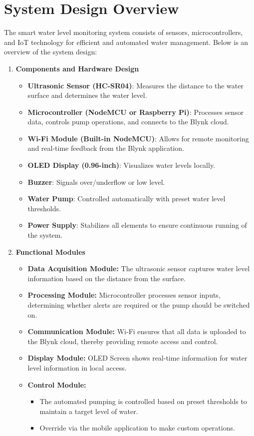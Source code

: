 \section{System Design Overview}
{\fontsize{12}{14}\selectfont
    The smart water level monitoring system consists of sensors, microcontrollers, and IoT technology for efficient and automated water management. Below is an overview of the system design: \\
    
    \begin{enumerate}
    \item \textbf{Components and Hardware Design}
    \begin{itemize}
        \item \textbf{Ultrasonic Sensor (HC-SR04)}: Measures the distance to the water surface and determines the water level.
        \item \textbf{Microcontroller (NodeMCU or Raspberry Pi)}: Processes sensor data, controls pump operations, and connects to the Blynk cloud.
        \item \textbf{Wi-Fi Module (Built-in NodeMCU)}: Allows for remote monitoring and real-time feedback from the Blynk application.
        \item \textbf{OLED Display (0.96-inch)}: Visualizes water levels locally.
        \item \textbf{Buzzer}: Signals over/underflow or low level.
        \item \textbf{Water Pump}: Controlled automatically with preset water level thresholds.
        \item \textbf{Power Supply}: Stabilizes all elements to ensure continuous running of the system.
    \end{itemize}
    
    \item \textbf{Functional Modules}
    \begin{itemize}
        \item \textbf{Data Acquisition Module:}  
        The ultrasonic sensor captures water level information based on the distance from the surface.
        \item \textbf{Processing Module:}  
        Microcontroller processes sensor inputs, determining whether alerts are required or the pump should be switched on.
        \item \textbf{Communication Module:}  
        Wi-Fi ensures that all data is uploaded to the Blynk cloud, thereby providing remote access and control.
        \item \textbf{Display Module:}  
        OLED Screen shows real-time information for water level information in local access.
        \item \textbf{Control Module:}  
        \begin{itemize}
            \item The automated pumping is controlled based on preset thresholds to maintain a target level of water.
            \item Override via the mobile application to make custom operations.
        \end{itemize}
    \end{itemize}


\end{enumerate}}
